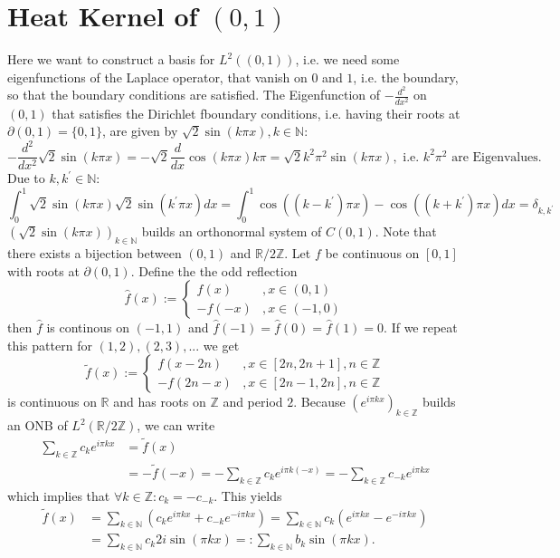 \documentclass[A4,12pt,twoside]{book}
\begin{document}
\section{Heat Kernel of $(0, 1)$}
Here we want to construct a basis for $L^2((0,1))$, i.e. we need some eigenfunctions of the Laplace operator, that vanish on $0$ and $1$, i.e. the boundary, so that the boundary conditions are satisfied. The Eigenfunction of $- \frac{d^2}{dx^2}$ on $(0,1)$ that satisfies the Dirichlet fboundary conditions, i.e. having their roots at $\partial (0,1) = \{0,1\}$, are given by $\sqrt{2} \sin (k \pi x), k \in \mathbb{N}$: 
\[
- \frac{d^2}{dx^2} \sqrt{2} \sin (k \pi x)= - \sqrt{2} \frac{d}{dx} \cos (k \pi x) k \pi = \sqrt{2} k^2 \pi^2 \sin (k \pi x), \text{ i.e. $k^2 \pi^2$ are Eigenvalues.}
\]
Due to $k, k^\prime \in \mathbb{N}$:
\[
\int_0^1 \sqrt{2} \sin (k \pi x) \sqrt{2} \sin (k^\prime \pi x) dx = \int_0^1 \cos( (k-k^\prime) \pi x ) - \cos ((k+k^\prime ) \pi x) dx = \delta_{k,k^\prime}
\]
$(\sqrt{2} \sin (k \pi x))_{k \in \mathbb{N}}$ builds an orthonormal system of $C(0,1)$. Note that there exists a bijection between $(0,1)$ and $\mathbb{R} / 2\mathbb{Z}$. Let $f$ be continuous on $[0,1]$ with roots at $\partial (0,1)$. Define the the odd reflection 
\[
\hat{f} (x) := \begin{cases}
    f(x) &, x \in (0,1) \\
    -f(-x) &, x \in (-1,0)
\end{cases}
\]
then $\hat{f}$ is continous on $(-1,1)$ and $\hat{f}(-1) = \hat{f}(0)=\hat{f}(1)=0$. If we repeat this pattern for $(1,2), (2,3),...$ we get 
\[
\tilde{f} (x) := \begin{cases}
    f(x-2n) &, x \in [2n,2n+1], n \in \mathbb{Z}\\
    -f(2n-x)&, x \in [2n-1,2n], n \in \mathbb{Z}
\end{cases}
\]
is continuous on $\mathbb{R}$ and has roots on $\mathbb{Z}$ and period $2$. Because $(e^{i \pi k x})_{k \in \mathbb{Z}}$ builds an ONB of $L^2(\mathbb{R}/ 2 \mathbb{Z})$, we can write
\begin{align*}
    \sum_{k \in \mathbb{Z}} c_k e^{i \pi k x} &= \tilde{f}(x) \\
    &= - \tilde{f}(-x) = - \sum_{k \in \mathbb{Z}} c_k e^{i \pi k (-x)} =- \sum_{k \in \mathbb{Z}} c_{-k} e^{i \pi k x}  
\end{align*}
which implies that $\forall k \in \mathbb{Z}: c_k = - c_{-k}$. This yields 
\begin{align*}
    \tilde{f}(x) &= \sum_{k \in \mathbb{N}} \left( c_k e^{i \pi k x} + c_{-k} e^{- i \pi k x} \right) = \sum_{k \in \mathbb{N}} c_k \left( e^{i \pi k x} - e^{- i \pi kx}\right) \\
    &= \sum_{k \in \mathbb{N}} c_k 2i \sin (\pi k x) =: \sum_{k \in \mathbb{N}} b_k \sin (\pi k x).
\end{align*}
\end{document}
